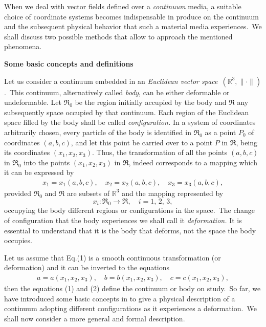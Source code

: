 \documentclass[12pt]{article}
\begin{document}
When we deal with vector fields defined over a {\em continuum} media, a suitable choice of coordinate systems becomes indispensable in  produce on the continuum and the subsequent physical behavior that such a material media experiences.\, We shall discuss two possible methods that allow to approach the mentioned phenomena.

\textbf{Some basic concepts and definitions}

Let us consider a continuum embedded in an {\em Euclidean vector space}\, $(\mathbb{R}^3,\lVert\cdot\rVert)$.\, This continuum, alternatively called {\em body}, can be either deformable or undeformable. Let $\Re_0$ be the region initially accupied by the body and $\Re$ any  subsequently space occupied by that continuum. Each region of the Euclidean space filled by the body shall be called {\em configuration.} In a system of coordinates arbitrarily chosen, every particle of the body is identified in $\Re_0$ as a point $P_0$ of coordinates $(a,b,c)$, and let this point be carried over to a point $P$ in $\Re$, being its coordinates $(x_1,x_2,x_3)$. Thus, the transformation of all the points $(a,b,c)$ in $\Re_0$ into the points $(x_1,x_2,x_3)$ in $\Re$, indeed corresponds to a mapping which it can be expressed by
\begin{align}
x_1=x_1(a,b,c), \quad x_2=x_2(a,b,c), \quad x_3=x_3(a,b,c),
\end{align}
provided $\Re_0$ and $\Re$ are subsets of $\mathbb{R}^3$ and the mapping represented by
\[x_i:\Re_0 \to \Re, \quad i = 1,\,2,\,3, \]
occupying the body different regions or configurations in the space.\, The change of configuration that the body experiences we shall call it {\em deformation.} It is essential to understand that it is the body that deforms, not the space the body occupies.

Let us assume that  Eq.(1) is a smooth continuous transformation (or deformation) and it can be inverted to the equations
\begin{align}
a=a(x_1,x_2,x_3), \quad b=b(x_1,x_2,x_3), \quad c=c(x_1,x_2,x_3),
\end{align}
then the equations (1) and (2) define the continuum or body on study.\, 
So far, we have introduced some basic concepts in  to give a physical description of a continuum adopting different configurations as it experiences a deformation.\, We shall now consider a more general and formal description.
\end{document}
